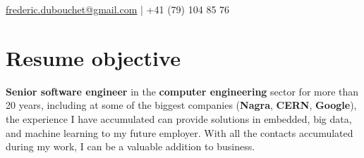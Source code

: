 \documentclass[a4paper]{deedy-resume} %
\begin{document}
\lastupdated


	{\href{mailto:frederic.dubouchet@gmail.com}{frederic.dubouchet@gmail.com} | +41 (79) 104 85 76}

\section{Resume objective}

\begin{flushleft}
	\textbf{Senior software engineer} in the \textbf{computer engineering} sector for more than 
	20 years, including at some of the biggest companies (\textbf{Nagra}, \textbf{CERN}, 
	\textbf{Google}), the experience I have accumulated can provide solutions in embedded, big data,
	and machine learning to my future employer. With all the contacts accumulated during my work,
	I can be a valuable addition to business.
\end{flushleft}


\noindent\makebox[\linewidth]{\color{headings}\rule{\paperwidth}{0.4pt}}

\end{document}
